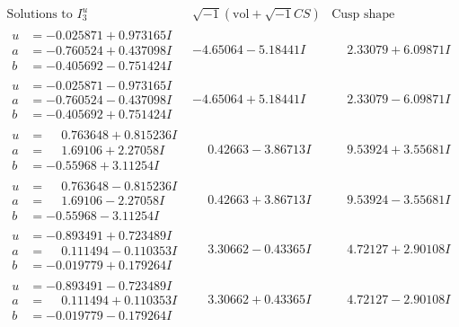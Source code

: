 \documentclass[1p]{elsarticle_modified}
\theoremstyle{definition}
\newcommand{\I}{\sqrt{-1}}
\begin{document}
$$\begin{array}{c|c|c}  
\text{Solutions to }I^u_{3}& \I (\text{vol} + \sqrt{-1}CS) & \text{Cusp shape}\\
 \hline 
\begin{aligned}
u &= -0.025871 + 0.973165 I \\
a &= -0.760524 + 0.437098 I \\
b &= -0.405692 - 0.751424 I\end{aligned}
 & -4.65064 - 5.18441 I & \phantom{-}2.33079 + 6.09871 I \\ \hline\begin{aligned}
u &= -0.025871 - 0.973165 I \\
a &= -0.760524 - 0.437098 I \\
b &= -0.405692 + 0.751424 I\end{aligned}
 & -4.65064 + 5.18441 I & \phantom{-}2.33079 - 6.09871 I \\ \hline\begin{aligned}
u &= \phantom{-}0.763648 + 0.815236 I \\
a &= \phantom{-}1.69106 + 2.27058 I \\
b &= -0.55968 + 3.11254 I\end{aligned}
 & \phantom{-}0.42663 - 3.86713 I & \phantom{-}9.53924 + 3.55681 I \\ \hline\begin{aligned}
u &= \phantom{-}0.763648 - 0.815236 I \\
a &= \phantom{-}1.69106 - 2.27058 I \\
b &= -0.55968 - 3.11254 I\end{aligned}
 & \phantom{-}0.42663 + 3.86713 I & \phantom{-}9.53924 - 3.55681 I \\ \hline\begin{aligned}
u &= -0.893491 + 0.723489 I \\
a &= \phantom{-}0.111494 - 0.110353 I \\
b &= -0.019779 + 0.179264 I\end{aligned}
 & \phantom{-}3.30662 - 0.43365 I & \phantom{-}4.72127 + 2.90108 I \\ \hline\begin{aligned}
u &= -0.893491 - 0.723489 I \\
a &= \phantom{-}0.111494 + 0.110353 I \\
b &= -0.019779 - 0.179264 I\end{aligned}
 & \phantom{-}3.30662 + 0.43365 I & \phantom{-}4.72127 - 2.90108 I \\ \hline\begin{aligned}

\end{aligned}
\end{array}$$
\end{document}
